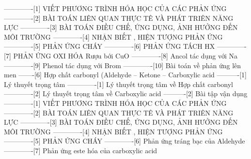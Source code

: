 -------------[1] VIẾT PHƯƠNG TRÌNH HÓA HỌC CỦA CÁC PHẢN ỨNG
-------------[2] BÀI TOÁN LIÊN QUAN THỰC TÊ VÀ PHÁT TRIÊN NĂNG LỰC
-------------[3] BÀI TOÁN ĐIỀU CHẾ, ỨNG DỤNG, ẢNH HƯỞNG ĐẾN MÔI TRƯỜNG 
-------------[4] NHẬN BIẾT , HIỆN TƯỢNG PHẢN ỨNG
-------------[5] PHẢN ỨNG CHÁY
-------------[6] PHẢN ỨNG TÁCH HX
-------------[7] PHẢN ỨNG OXI HÓA Rượu bới CuO
-------------[8] Ancol tác dụng với Na
-------------[9] Phenol tác dụng với Brom
-------------[10] Bài toán về phản ứng lên men
-------[6] Hợp chất carbonyl (Aldehyde – Ketone – Carboxylic acid
----------[1] Lý thuyết trọng tâm
-------------[1] Lý thuyết trọng tâm về Hợp chất carbonyl
-------------[2] Lý thuyết trọng tâm về Carboxylic acid 
----------[2] Bài tập vận dụng
-------------[1] VIẾT PHƯƠNG TRÌNH HÓA HỌC CỦA CÁC PHẢN ỨNG
-------------[2] BÀI TOÁN LIÊN QUAN THỰC TÊ VÀ PHÁT TRIÊN NĂNG LỰC
-------------[3] BÀI TOÁN ĐIỀU CHẾ, ỨNG DỤNG, ẢNH HƯỞNG ĐẾN MÔI TRƯỜNG 
-------------[4] NHẬN BIẾT , HIỆN TƯỢNG PHẢN ỨNG
-------------[5] PHẢN ỨNG CHÁY
-------------[6] Phản ứng tráng bạc của Aldehyde
-------------[7] Phản ứng este hóa của carboxylic acid




